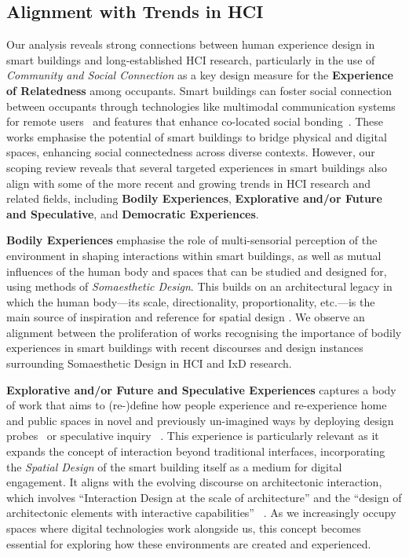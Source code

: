 \subsection{Alignment with Trends in HCI}
Our analysis reveals strong connections between human experience design in smart buildings and long-established HCI research, particularly in the use of \textit{Community and Social Connection} as a key design measure for the \textbf{Experience of Relatedness} among occupants. Smart buildings can foster social connection between occupants through technologies like multimodal communication systems for remote users~\cite{hansen2009pendaphonics} and features that enhance co-located social bonding~\cite{nabil2020peace}. These works emphasise the potential of smart buildings to bridge physical and digital spaces, enhancing social connectedness across diverse contexts. However, our scoping review reveals that several targeted experiences in smart buildings also align with some of the more recent and growing trends in HCI research and related fields, including \textbf{Bodily Experiences}, \textbf{Explorative and/or Future and Speculative}, and \textbf{Democratic Experiences}. 

\textbf{Bodily Experiences} emphasise the role of multi-sensorial perception of the environment in shaping interactions within smart buildings, as well as mutual influences of the human body and spaces  that can be studied and designed for, using methods of \textit{Somaesthetic Design}. This builds on an architectural legacy in which the human body---its scale, directionality, proportionality, etc.---is the main source of inspiration and reference for spatial design \cite{shusterman2011somaesthetics}. We observe an alignment between the proliferation of works recognising the importance of bodily experiences in smart buildings with recent discourses and design instances surrounding Somaesthetic Design in HCI and IxD research. 

\textbf{Explorative and/or Future and Speculative Experiences} captures a body of work that aims to (re-)define how people experience and re-experience home and public spaces in novel and previously un-imagined ways by deploying design probes~\cite{gaver2004cultural} or speculative inquiry ~\cite{galloway2018speculative}. This experience is particularly relevant as it expands the concept of interaction beyond traditional interfaces, incorporating the \textit{Spatial Design} of the smart building itself as a medium for digital engagement. It aligns with the evolving discourse on architectonic interaction, which involves ``Interaction Design at the scale of architecture'' and the ``design of architectonic elements with interactive capabilities'' ~\cite{wiberg2020interaction}. As we increasingly occupy spaces where digital technologies work alongside us, this concept becomes essential for exploring how these environments are created and experienced.

